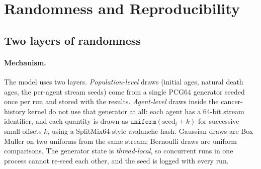 \documentclass[12pt,a4paper]{article}
\newcommand{\id}[1]{\texttt{#1}}
\newcommand{\mech}[1]{\paragraph{Mechanism.} #1}
\begin{document}
\section{Randomness and Reproducibility}

\subsection{Two layers of randomness}

\mech{The model uses two layers. \emph{Population-level} draws (initial ages, natural death ages, the
per-agent stream seeds) come from a single PCG64 generator seeded once per run and stored with the results.
\emph{Agent-level} draws inside the cancer-history kernel do not use that generator at all: each agent has a
64-bit stream identifier, and each quantity is drawn as $\id{uniform}(\text{seed}_i + k)$ for successive
small offsets $k$, using a SplitMix64-style avalanche hash. Gaussian draws are Box--Muller on two uniforms
from the same stream; Bernoulli draws are uniform comparisons. The generator state is \emph{thread-local},
so concurrent runs in one process cannot re-seed each other, and the seed is logged with every run.}
\end{document}

